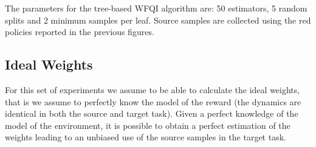     \noindent The parameters for the tree-based WFQI algorithm are: 50 estimators, 5 random splits and 2 minimum samples per leaf.
    Source samples are collected using the red policies reported in the previous figures.

    \subsection{Ideal Weights}
    \noindent For this set of experiments we assume to be able to calculate the ideal weights, that is we assume
    to perfectly know the model of the reward (the dynamics are identical in both the source and target task).
    Given a perfect knowledge of the model of the environment, it is possible to obtain a perfect estimation of
    the weights leading to an unbiased use of the source samples in the target task.


